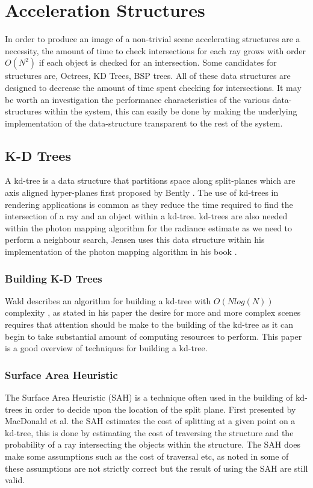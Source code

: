 \section{Acceleration Structures}
In order to produce an image of a non-trivial scene accelerating structures are a necessity, the
amount of time to check intersections for each ray grows with order  $O(N^2)$ if each object is
checked for an intersection. Some candidates for structures are, Octrees, KD Trees, BSP trees. All
of these data structures are designed to decrease the amount of time spent checking for 
intersections. It may be worth an investigation the performance characteristics of the various
data-structures within the system, this can easily be done by making the underlying implementation
of the data-structure transparent to the rest of the system.

\subsection{K-D Trees}
A kd-tree is a data structure that partitions space along split-planes which are axis aligned
hyper-planes first proposed by Bently \cite{Bently75}.
The use of kd-trees in rendering applications is common as they reduce the time
required to find the intersection of a ray and an object within a kd-tree. kd-trees are also needed
within the photon mapping algorithm for the radiance estimate as we need to perform a
neighbour search, Jensen uses this data structure within his implementation of the photon mapping
algorithm in his book \cite{JensenBook}.

\subsubsection{Building K-D Trees}
Wald describes an algorithm for building a kd-tree with $O(N log(N))$ complexity \cite{Wald06}, as stated in his
paper the desire for more and more complex scenes requires that attention should be make to the 
building of the kd-tree as it can begin to take substantial amount of computing resources to
perform. This paper is a good overview of techniques for building a kd-tree.

\subsubsection{Surface Area Heuristic}
The Surface Area Heuristic (SAH) is a technique often used in the building of kd-trees in order to
decide upon the location of the split plane. First presented by MacDonald et al. \cite{MacDonald90}
the SAH estimates the cost of splitting at a given point on a kd-tree, this is done by estimating the
cost of traversing the structure and the probability of a ray intersecting the objects within the
structure. The SAH does make some assumptions such as the cost of traversal etc, as noted in
\cite{Wald06} some of these assumptions are not strictly correct but the result of using the SAH
are still valid.

